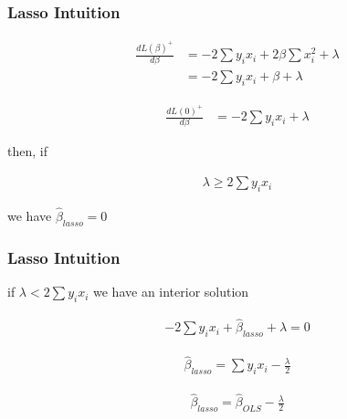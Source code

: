 \documentclass[
  shownotes,
  xcolor={svgnames},
  hyperref={colorlinks,citecolor=DarkBlue,linkcolor=DarkRed,urlcolor=DarkBlue}
  ]{beamer}
\begin{document}
\begin{frame}[fragile]
\frametitle{Lasso Intuition}

\begin{align}
\frac{dL(\beta)^+}{d\beta} &= -2 \sum y_ix_i+ 2 \beta \sum x_i^2 + \lambda \nonumber \\
& = -2 \sum y_ix_i +\beta + \lambda
\end{align}

\begin{align}
\frac{dL(0)^+}{d\beta} &= -2 \sum y_ix_i + \lambda \nonumber 
\end{align}

then, if 

\begin{align}
   \lambda \geq 2 \sum y_ix_i 
\end{align}

we have $\hat{\beta}_{lasso}=0$

 \end{frame}
\begin{frame}[fragile]
\frametitle{Lasso Intuition}
if  $\lambda < 2 \sum y_ix_i $ we have an interior solution

\begin{align}
  -2 \sum y_ix_i + \hat{\beta}_{lasso} + \lambda =0
\end{align}

\bigskip
\begin{align}
    \hat{\beta}_{lasso} =\sum y_ix_i  - \frac{\lambda}{2}
\end{align}

\bigskip
\begin{align}
    \hat{\beta}_{lasso} =  \hat{\beta}_{OLS} - \frac{\lambda}{2}
\end{align}

\end{frame}

\end{document}
